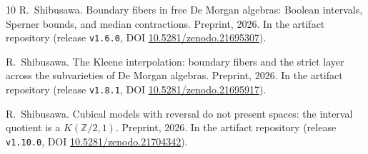 \documentclass[11pt]{amsart}
\theoremstyle{definition}
\begin{document}
\begin{thebibliography}{10}
R.~Shibusawa.
\newblock Boundary fibers in free De Morgan algebras: Boolean
  intervals, Sperner bounds, and median contractions.
\newblock Preprint, 2026.  In the artifact repository (release
  \texttt{v1.6.0}, DOI
  \href{https://doi.org/10.5281/zenodo.21695307}%
{10.5281/zenodo.21695307}).

R.~Shibusawa.
\newblock The Kleene interpolation: boundary fibers and the strict
  layer across the subvarieties of De Morgan algebras.
\newblock Preprint, 2026.  In the artifact repository (release
  \texttt{v1.8.1}, DOI
  \href{https://doi.org/10.5281/zenodo.21695917}%
{10.5281/zenodo.21695917}).

R.~Shibusawa.
\newblock Cubical models with reversal do not present spaces: the
  interval quotient is a $K(\mathbb{Z}/2,1)$.
\newblock Preprint, 2026.  In the artifact repository (release
  \texttt{v1.10.0}, DOI
  \href{https://doi.org/10.5281/zenodo.21704342}%
{10.5281/zenodo.21704342}).

\end{thebibliography}
\end{document}
